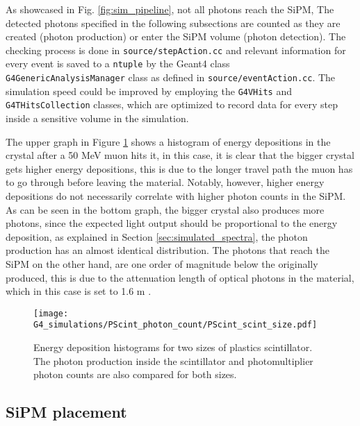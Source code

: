 As showcased in Fig. \ref{fig:sim_pipeline}, not all photons reach the SiPM, The detected photons specified in the following subsections are counted as they are created (photon production) or enter the SiPM volume (photon detection). The checking process is done in \texttt{source/stepAction.cc} and relevant information for every event is saved to a \texttt{ntuple} by the Geant4 class\\ \texttt{G4GenericAnalysisManager} class as defined in \texttt{source/eventAction.cc}. The simulation speed could be improved by employing the \texttt{G4VHits} and \texttt{G4THitsCollection} classes, which are optimized to record data for every step inside a sensitive volume in the simulation.

The upper graph in Figure \ref{fig:LYSO_PScint_phot_count} shows a histogram of energy depositions in the crystal after a 50 \unit{\mega\eV} muon hits it, in this case, it is clear that the bigger crystal gets higher energy depositions, this is due to the longer travel path the muon has to go through before leaving the material. Notably, however, higher energy depositions do not necessarily correlate with higher photon counts in the SiPM. As can be seen in the bottom graph, the bigger crystal also produces more photons, since the expected light output should be proportional to the energy deposition, as explained in Section \ref{sec:simulated_spectra}, the photon production has an almost identical distribution. The photons that reach the SiPM on the other hand, are one order of magnitude below the originally produced, this is due to the attenuation length of optical photons in the material, which in this case is set to 1.6 \unit{\m} \cite{Luxium_plastic}.

\begin{figure}[H]
  \centering
  \texttt{[image: G4\_simulations/PScint\_photon\_count/PScint\_scint\_size.pdf]}
  \caption{\label{fig:LYSO_PScint_phot_count}Energy deposition histograms for two sizes of plastics scintillator. The photon production inside the scintillator and photomultiplier photon counts are also compared for both sizes.}
\end{figure}

\subsection{SiPM placement}\label{sec:SiPM_placement}

